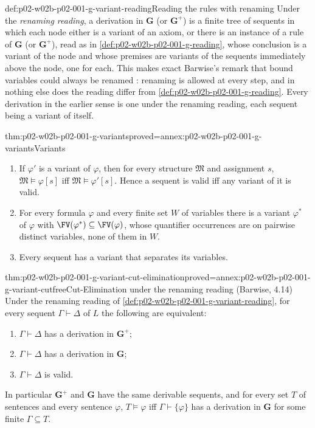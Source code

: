 \begin{hbconvention}{def:p02-w02b-p02-001-g-variant-reading}{Reading the rules with renaming}
Under the \emph{renaming reading}, a derivation in \(\mathbf G\) (or
\(\mathbf G^{+}\)) is a finite tree of sequents in which each node either
is a variant of an axiom, or there is an instance of a rule of \(\mathbf G\)
(or \(\mathbf G^{+}\)), read as in \cref{def:p02-w02b-p02-001-g-reading},
whose conclusion is a variant of the node and whose premises are variants
of the sequents immediately above the node, one for each.  This makes
exact Barwise's remark that bound variables could always be renamed
\cite[ch.~A.1, \S3, p.~22]{Barwise1977FirstOrder}: renaming is allowed at
every step, and in nothing else does the reading differ from
\cref{def:p02-w02b-p02-001-g-reading}.  Every derivation in the earlier
sense is one under the renaming reading, each sequent being a variant of
itself.
\end{hbconvention}

\begin{hblemma}{thm:p02-w02b-p02-001-g-variants}{proved=annex:p02-w02b-p02-001-g-variants}{Variants}
\begin{enumerate}
\item If \(\varphi'\) is a variant of \(\varphi\), then for every structure
      \(\mathfrak M\) and assignment \(s\),
      \(\mathfrak M\models\varphi[s]\) iff \(\mathfrak M\models\varphi'[s]\).
      Hence a sequent is valid iff any variant of it is valid.
\item For every formula \(\varphi\) and every finite set \(W\) of variables
      there is a variant \(\varphi^{*}\) of \(\varphi\) with
      \(\FV(\varphi^{*})\subseteq\FV(\varphi)\), whose quantifier
      occurrences are on pairwise distinct variables, none of them in
      \(W\).
\item Every sequent has a variant that separates its variables.
\end{enumerate}
\end{hblemma}

\begin{hbtheorem}{thm:p02-w02b-p02-001-g-variant-cut-elimination}{proved=annex:p02-w02b-p02-001-g-variant-cutfree}{Cut-Elimination under the renaming reading (Barwise, 4.14)}
Under the renaming reading of \cref{def:p02-w02b-p02-001-g-variant-reading},
for every sequent \(\Gamma\vdash\Delta\) of \(L\) the following are
equivalent:
\begin{enumerate}
\item[(i)] \(\Gamma\vdash\Delta\) has a derivation in \(\mathbf G^{+}\);
\item[(ii)] \(\Gamma\vdash\Delta\) has a derivation in \(\mathbf G\);
\item[(iii)] \(\Gamma\vdash\Delta\) is valid.
\end{enumerate}
In particular \(\mathbf G^{+}\) and \(\mathbf G\) have the same derivable
sequents, and for every set \(T\) of sentences and every sentence
\(\varphi\), \(T\models\varphi\) iff \(\Gamma\vdash\{\varphi\}\) has a
derivation in \(\mathbf G\) for some finite \(\Gamma\subseteq T\).
\end{hbtheorem}

